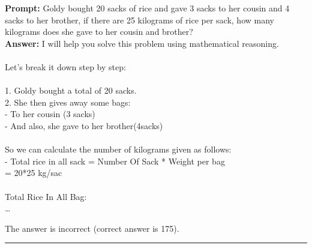 \begin{displayquote}
	\textbf{Prompt:} Goldy bought 20 sacks of rice and gave 3 sacks to her cousin and 4 sacks to her brother, if there are 25 kilograms of rice per sack, how many kilograms does she gave to her cousin and brother?\\
	\textbf{Answer:} I will help you solve this problem using mathematical reasoning.\\
	\\
	Let's break it down step by step:\\
	\\
	1. Goldy bought a total of 20 sacks.\\
	2. She then gives away some bags:\\
	- To her cousin (3 sacks)\\
	- And also, she gave to her brother(4sacks)\\
	\\
	So we can calculate the number of kilograms given as follows:\\
	- Total rice in all sack = Number Of Sack * Weight per bag\\
	= 20*25 kg/sac\\
	\\
	Total Rice In All Bag:\\
	\dots
\end{displayquote}
The answer is incorrect (correct answer is 175).

\noindent\rule{\textwidth}{0.4pt}

